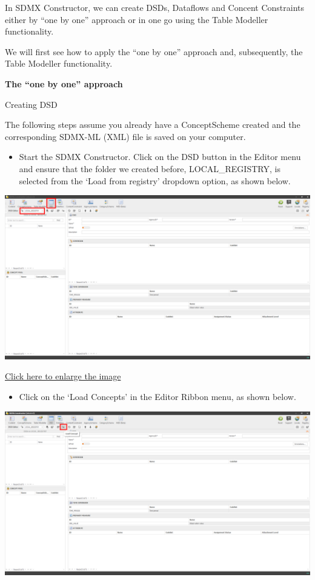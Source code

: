 \documentclass[
]{book}
\providecommand{\tightlist}{%
  \setlength{\itemsep}{0pt}\setlength{\parskip}{0pt}}
\begin{document}
In SDMX Constructor, we can create DSDs, Dataflows and Concent Constraints either by ``one by one'' approach or in one go using the Table Modeller functionality.

We will first see how to apply the ``one by one'' approach and, subsequently, the Table Modeller functionality.

\textbf{The ``one by one'' approach}

Creating DSD

The following steps assume you already have a ConceptScheme created and the corresponding SDMX-ML (XML) file is saved on your computer.

\begin{itemize}
\tightlist
\item
  Start the SDMX Constructor. Click on the DSD button in the Editor menu and ensure that the folder we created before, LOCAL\_REGISTRY, is selected from the `Load from registry' dropdown option, as shown below.
\end{itemize}

\begin{center}\includegraphics[width=1\linewidth]{./images/image247} \end{center}

\href{images/image247.png}{Click here to enlarge the image}

\begin{itemize}
\tightlist
\item
  Click on the `Load Concepts' in the Editor Ribbon menu, as shown below.
\end{itemize}

\begin{center}\includegraphics[width=1\linewidth]{./images/image248} \end{center}
\end{document}
